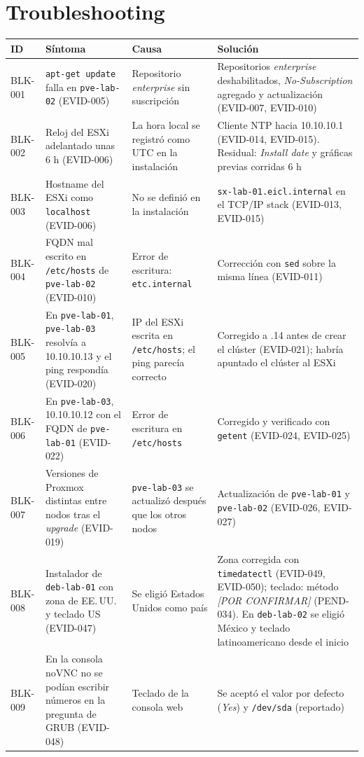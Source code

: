 \documentclass[11pt,a4paper]{article}
\newcommand{\pc}{\textcolor{muted}{\textit{[POR CONFIRMAR]}}}
\newcommand{\cab}{\rowcolor{light}}
\newcommand{\fn}[1]{\texttt{\fnbreaks#1\fnend}}
\def\fnbreaks#1\fnend{\begingroup\fnactive\scantokens{#1\noexpand}\endgroup}
\gdef\fnactive{\catcode`\-=\active\catcode`\/=\active
  \def-{\char`\-\allowbreak}\def/{\char`\/\allowbreak}\let\_\fnus}
\newcommand{\fnus}{\textunderscore\allowbreak}
\begin{document}
\section{Troubleshooting}
{\small
\begin{longtable}{L{1.5cm} L{4.0cm} L{4.3cm} L{4.9cm}}
  \toprule
  \cab\textbf{ID} & \textbf{Síntoma} & \textbf{Causa} & \textbf{Solución}\\
  \midrule
  \endhead
  BLK-001 & \texttt{apt-get update} falla en \texttt{pve-lab-02} (EVID-005) & Repositorio \emph{enterprise} sin suscripción & Repositorios \emph{enterprise} deshabilitados, \emph{No-Subscription} agregado y actualización (EVID-007, EVID-010)\\
  BLK-002 & Reloj del ESXi adelantado unas 6 h (EVID-006) & La hora local se registró como UTC en la instalación & Cliente NTP hacia 10.10.10.1 (EVID-014, EVID-015). Residual: \emph{Install date} y gráficas previas corridas 6 h\\
  BLK-003 & Hostname del ESXi como \texttt{localhost} (EVID-006) & No se definió en la instalación & \fn{esx-lab-01.eicl.internal} en el TCP/IP stack (EVID-013, EVID-015)\\
  BLK-004 & FQDN mal escrito en \texttt{/etc/hosts} de \texttt{pve-lab-02} (EVID-010) & Error de escritura: \texttt{etc.internal} & Corrección con \texttt{sed} sobre la misma línea (EVID-011)\\
  BLK-005 & En \texttt{pve-lab-01}, \texttt{pve-lab-03} resolvía a 10.10.10.13 y el ping respondía (EVID-020) & IP del ESXi escrita en \texttt{/etc/hosts}; el ping parecía correcto & Corregido a .14 antes de crear el clúster (EVID-021); habría apuntado el clúster al ESXi\\
  BLK-006 & En \texttt{pve-lab-03}, 10.10.10.12 con el FQDN de \texttt{pve-lab-01} (EVID-022) & Error de escritura en \texttt{/etc/hosts} & Corregido y verificado con \texttt{getent} (EVID-024, EVID-025)\\
  BLK-007 & Versiones de Proxmox distintas entre nodos tras el \emph{upgrade} (EVID-019) & \texttt{pve-lab-03} se actualizó después que los otros nodos & Actualización de \texttt{pve-lab-01} y \texttt{pve-lab-02} (EVID-026, EVID-027)\\
  BLK-008 & Instalador de \texttt{deb-lab-01} con zona de EE.\,UU. y teclado US (EVID-047) & Se eligió Estados Unidos como país & Zona corregida con \texttt{timedatectl} (EVID-049, EVID-050); teclado: método \pc{} (PEND-034). En \texttt{deb-lab-02} se eligió México y teclado latinoamericano desde el inicio\\
  BLK-009 & En la consola noVNC no se podían escribir números en la pregunta de GRUB (EVID-048) & Teclado de la consola web & Se aceptó el valor por defecto (\emph{Yes}) y \texttt{/dev/sda} (reportado)\\
  \bottomrule
\end{longtable}
}
\end{document}
